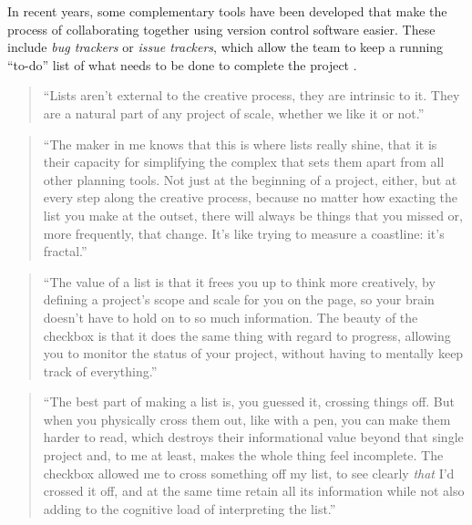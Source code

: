\documentclass[]{tufte-book}
\begin{document}
In recent years, some complementary tools have been developed that make the
process of collaborating together using version control software easier. These
include \emph{bug trackers} or \emph{issue trackers}, which allow the team to keep a running ``to-do''
list of what needs to be done to complete the project \citep{perez2016ten}.

\begin{quote}
``Lists aren't external to the creative process, they are intrinsic to it. They are
a natural part of any project of scale, whether we like it or not.'' \citep{savage2020every}
\end{quote}

\begin{quote}
``The maker in me knows that this is where lists really shine, that it is their capacity
for simplifying the complex that sets them apart from all other planning tools.
Not just at the beginning of a project, either, but at every step along the
creative process, because no matter how exacting the list you make at the outset,
there will always be things that you missed or, more frequently, that change. It's
like trying to measure a coastline: it's fractal.'' \citep{savage2020every}
\end{quote}

\begin{quote}
``The value of a list is that it frees you up to think more creatively, by
defining a project's scope and scale for you on the page, so your brain doesn't
have to hold on to so much information. The beauty of the checkbox is that it
does the same thing with regard to progress, allowing you to monitor the status
of your project, without having to mentally keep track of everything.'' \citep{savage2020every}
\end{quote}

\begin{quote}
``The best part of making a list is, you guessed it, crossing things off. But when you
physically cross them out, like with a pen, you can make them harder to read, which
destroys their informational value beyond that single project and, to me at least, makes
the whole thing feel incomplete. The checkbox allowed me to cross something off my list,
to see clearly \emph{that} I'd crossed it off, and at the same time retain all its
information while not also adding to the cognitive load of interpreting the list.''
\citep{savage2020every}
\end{quote}
\end{document}
